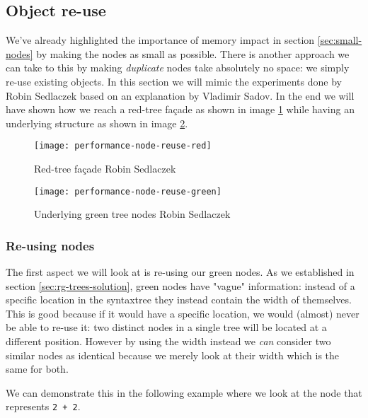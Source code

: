 \subsection{Object re-use}
\label{sec:object-reuse}

We've already highlighted the importance of memory impact in section \ref{sec:small-nodes} by making the nodes as small as possible. There is another approach we can take to this by making \textit{duplicate} nodes take absolutely no space: we simply re-use existing objects. In this section we will mimic the experiments done by Robin Sedlaczek\parencite{Sedlaczek2015} based on an explanation by Vladimir Sadov\parencite{Sadov2014}. In the end we will have shown how we reach a red-tree façade as shown in image \ref{img:performance-node-reuse-red} while having an underlying structure as shown in image \ref{img:performance-node-reuse-green}.

\begin{figure}[h]
\centering
\texttt{[image: performance-node-reuse-red]}
\caption[Red-tree façade]{Red-tree façade \textcopyright Robin Sedlaczek}
\label{img:performance-node-reuse-red}
\end{figure}

\begin{figure}[h]
\centering
\texttt{[image: performance-node-reuse-green]}
\caption[Underlying green tree nodes]{Underlying green tree nodes \textcopyright Robin Sedlaczek}
\label{img:performance-node-reuse-green}
\end{figure}

\subsubsection{Re-using nodes}
\label{sec:re-use-nodes}

The first aspect we will look at is re-using our green nodes. As we established in section \ref{sec:rg-trees-solution}, green nodes have "vague" information: instead of a specific location in the \gls{syntaxtree} they instead contain the width of themselves. This is good because if it would have a specific location, we would (almost) never be able to re-use it: two distinct nodes in a single tree will be located at a different position. However by using the width instead we \textit{can} consider two similar nodes as identical because we merely look at their width which is the same for both.

We can demonstrate this in the following example where we look at the node that represents \texttt{2 + 2}.

